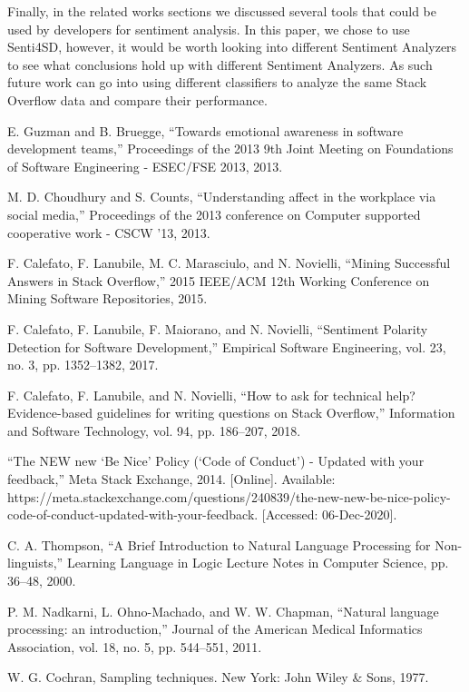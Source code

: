 \documentclass[conference]{IEEEtran}
\begin{document}
Finally, in the related works sections we discussed several tools that could be used by developers for sentiment analysis. In this paper, we chose to use Senti4SD, however, it would be worth looking into different Sentiment Analyzers to see what conclusions hold up with different Sentiment Analyzers. As such future work can go into using different classifiers to analyze the same Stack Overflow data and compare their performance.

\begin{thebibliography}{00}
 E. Guzman and B. Bruegge, “Towards emotional awareness in software development teams,” Proceedings of the 2013 9th Joint Meeting on Foundations of Software Engineering - ESEC/FSE 2013, 2013. 

 M. D. Choudhury and S. Counts, “Understanding affect in the workplace via social media,” Proceedings of the 2013 conference on Computer supported cooperative work - CSCW '13, 2013. 

 F. Calefato, F. Lanubile, M. C. Marasciulo, and N. Novielli, “Mining Successful Answers in Stack Overflow,” 2015 IEEE/ACM 12th Working Conference on Mining Software Repositories, 2015. 

 F. Calefato, F. Lanubile, F. Maiorano, and N. Novielli, “Sentiment Polarity Detection for Software Development,” Empirical Software Engineering, vol. 23, no. 3, pp. 1352–1382, 2017. 

 F. Calefato, F. Lanubile, and N. Novielli, “How to ask for technical help? Evidence-based guidelines for writing questions on Stack Overflow,” Information and Software Technology, vol. 94, pp. 186–207, 2018. 

 “The NEW new ‘Be Nice’ Policy (‘Code of Conduct’) - Updated with your feedback,” Meta Stack Exchange, 2014. [Online]. Available: https://meta.stackexchange.com/questions/240839/the-new-new-be-nice-policy-code-of-conduct-updated-with-your-feedback. [Accessed: 06-Dec-2020]. 

 C. A. Thompson, “A Brief Introduction to Natural Language Processing for Non-linguists,” Learning Language in Logic Lecture Notes in Computer Science, pp. 36–48, 2000. 

 P. M. Nadkarni, L. Ohno-Machado, and W. W. Chapman, “Natural language processing: an introduction,” Journal of the American Medical Informatics Association, vol. 18, no. 5, pp. 544–551, 2011.

 W. G. Cochran, Sampling techniques. New York: John Wiley \& Sons, 1977. 


\end{thebibliography}
\end{document}
